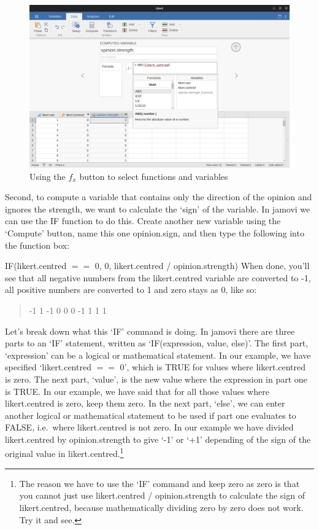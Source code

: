 \documentclass[
  a4paper,
]{book}
\begin{document}
\begin{figure}

\includegraphics[width=1\textwidth,height=\textheight]{images/fig6-5.png} \hfill{}

\caption{\label{fig-fig6-5}Using the \(f_x\) button to select functions
and variables}

\end{figure}

Second, to compute a variable that contains only the direction of the
opinion and ignores the strength, we want to calculate the `sign' of the
variable. In jamovi we can use the IF function to do this. Create
another new variable using the `Compute' button, name this one
opinion.sign, and then type the following into the function box:

IF(likert.centred \(==\) 0, 0, likert.centred / opinion.strength) When
done, you'll see that all negative numbers from the likert.centred
variable are converted to -1, all positive numbers are converted to 1
and zero stays as 0, like so:

\begin{quote}
-1 1 -1 0 0 0 -1 1 1 1
\end{quote}

Let's break down what this `IF' command is doing. In jamovi there are
three parts to an `IF' statement, written as `IF(expression, value,
else)'. The first part, `expression' can be a logical or mathematical
statement. In our example, we have specified `likert.centred \(==\) 0',
which is TRUE for values where likert.centred is zero. The next part,
`value', is the new value where the expression in part one is TRUE. In
our example, we have said that for all those values where likert.centred
is zero, keep them zero. In the next part, `else', we can enter another
logical or mathematical statement to be used if part one evaluates to
FALSE, i.e.~where likert.centred is not zero. In our example we have
divided likert.centred by opinion.strength to give `-1' or `+1'
depending of the sign of the original value in
likert.centred.\footnote{The reason we have to use the `IF' command and
  keep zero as zero is that you cannot just use likert.centred /
  opinion.strength to calculate the sign of likert.centred, because
  mathematically dividing zero by zero does not work. Try it and see.}
\end{document}
